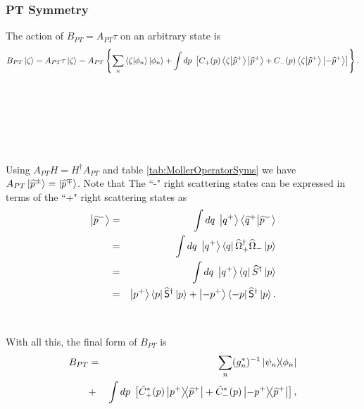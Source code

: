 \subsubsection{PT Symmetry}
The action of $B_{PT} = A_{PT}\tau$ on an arbitrary state is
%
\begin{equation}
    B_{PT}\ket{\zeta} = A_{PT}\tau\ket{\zeta}
                                   = A_{PT} \left\{ \sum_n \braket{\zeta}{\phi_n} \ket{\phi_n} + \int dp\; \left[ C_+(p) \braket{\zeta}{\widehat{p}^+}\ket{\widehat{p}^+} + C_-(p)\braket{\zeta}{\widehat{p}^+}\ket{-\widehat{p}^+} \right] \right\}.
\end{equation}
%
~\\
~\\
~\\
~\\
~\\
~\\
Using $A_{PT} H = H^\dagger A_{PT}$ and table \ref{tab:MollerOperatorSyms} we have $A_{PT} \ket{\widehat{p}^\pm} = \ket{\widehat{p}^\mp}$. Note that The ``-" right scattering states can be expressed in terms of the ``+" right scattering states as
%
\begin{eqnarray}
    \ket{\widehat{p}^-} &=& \int dq\; \ket{q^+}\braket{\widehat{q}^+}{\widehat{p}^-}\nonumber\\
    &=& \int dq\; \ket{q^+}\bra{q}\widehat{\Omega}_+^\dagger \widehat{\Omega}_- \ket{p}\nonumber\\
    &=& \int dq\; \ket{q^+}\bra{q} \widehat{S}^\dagger \ket{p}\nonumber\\
    &=& \ket{p^+}\bra{p} \widehat{\mathsf{S}}^\dagger \ket{p} + \ket{-p^+}\bra{-p} \widehat{\mathsf{S}}^\dagger \ket{p}.
\end{eqnarray}
%
%
~\\~\\
With all this, the final form of $B_{PT}$ is
%
\begin{eqnarray}
    B_{PT} &=&   \sum_n (g_n^*)^{-1} \ketbra{\psi_n}{\phi_n} \nonumber \\
                &+& \int dp\; \left[ \tilde{C}_+^*(p)\ketbra{p^+}{\widehat{p}^+} + \tilde{C}_-^*(p)\ketbra{-p^+}{\widehat{p}^+} \right], \nonumber \\
\label{C13}
\end{eqnarray}

